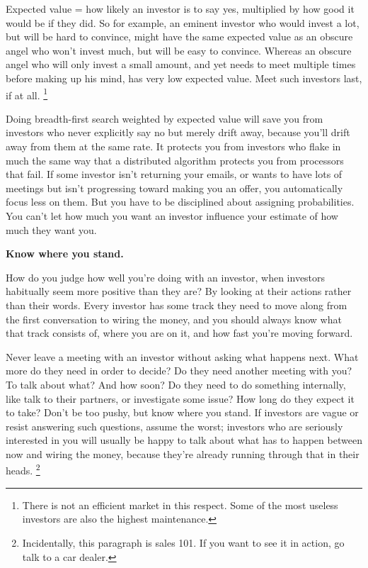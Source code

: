 \documentclass[12pt]{book}
\begin{document}
Expected value = how likely an investor is to say yes, multiplied by how
good it would be if they did. So for example, an eminent investor who
would invest a lot, but will be hard to convince, might have the same
expected value as an obscure angel who won't invest much, but will be
easy to convince. Whereas an obscure angel who will only invest a small
amount, and yet needs to meet multiple times before making up his mind,
has very low expected value. Meet such investors last, if at all.
\footnote{There is not an efficient market in this respect. Some of the
most useless investors are also the highest maintenance.}

Doing breadth-first search weighted by expected value will save you from
investors who never explicitly say no but merely drift away, because
you'll drift away from them at the same rate. It protects you from
investors who flake in much the same way that a distributed algorithm
protects you from processors that fail. If some investor isn't returning
your emails, or wants to have lots of meetings but isn't progressing
toward making you an offer, you automatically focus less on them. But
you have to be disciplined about assigning probabilities. You can't let
how much you want an investor influence your estimate of how much they
want you.

\textbf{Know where you stand.}

How do you judge how well you're doing with an investor, when investors
habitually seem more positive than they are? By looking at their actions
rather than their words. Every investor has some track they need to move
along from the first conversation to wiring the money, and you should
always know what that track consists of, where you are on it, and how
fast you're moving forward.

Never leave a meeting with an investor without asking what happens next.
What more do they need in order to decide? Do they need another meeting
with you? To talk about what? And how soon? Do they need to do something
internally, like talk to their partners, or investigate some issue? How
long do they expect it to take? Don't be too pushy, but know where you
stand. If investors are vague or resist answering such questions, assume
the worst; investors who are seriously interested in you will usually be
happy to talk about what has to happen between now and wiring the money,
because they're already running through that in their heads.
\footnote{Incidentally, this paragraph is sales 101. If you want to see
it in action, go talk to a car dealer.}
\end{document}
